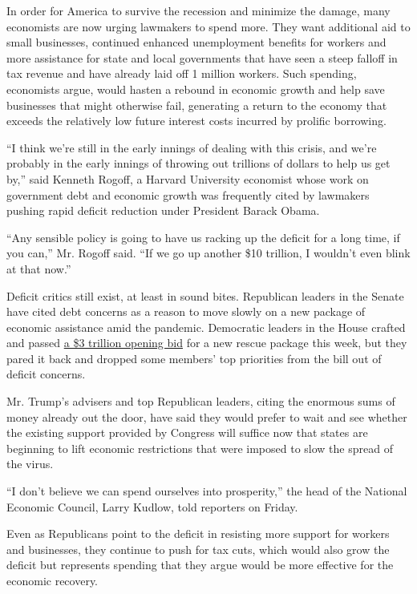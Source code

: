 In order for America to survive the recession and minimize the damage,
many economists are now urging lawmakers to spend more. They want
additional aid to small businesses, continued enhanced unemployment
benefits for workers and more assistance for state and local governments
that have seen a steep falloff in tax revenue and have already laid off
1 million workers. Such spending, economists argue, would hasten a
rebound in economic growth and help save businesses that might otherwise
fail, generating a return to the economy that exceeds the relatively low
future interest costs incurred by prolific borrowing.

``I think we're still in the early innings of dealing with this crisis,
and we're probably in the early innings of throwing out trillions of
dollars to help us get by,'' said Kenneth Rogoff, a Harvard University
economist whose work on government debt and economic growth was
frequently cited by lawmakers pushing rapid deficit reduction under
President Barack Obama.

``Any sensible policy is going to have us racking up the deficit for a
long time, if you can,'' Mr. Rogoff said. ``If we go up another \$10
trillion, I wouldn't even blink at that now.''

Deficit critics still exist, at least in sound bites. Republican leaders
in the Senate have cited debt concerns as a reason to move slowly on a
new package of economic assistance amid the pandemic. Democratic leaders
in the House crafted and passed
\href{https://www.nytimes3xbfgragh.onion/2020/05/15/us/politics/house-simulus-vote.html}{a
\$3 trillion opening bid} for a new rescue package this week, but they
pared it back and dropped some members' top priorities from the bill out
of deficit concerns.

Mr. Trump's advisers and top Republican leaders, citing the enormous
sums of money already out the door, have said they would prefer to wait
and see whether the existing support provided by Congress will suffice
now that states are beginning to lift economic restrictions that were
imposed to slow the spread of the virus.

``I don't believe we can spend ourselves into prosperity,'' the head of
the National Economic Council, Larry Kudlow, told reporters on Friday.

Even as Republicans point to the deficit in resisting more support for
workers and businesses, they continue to push for tax cuts, which would
also grow the deficit but represents spending that they argue would be
more effective for the economic recovery.

